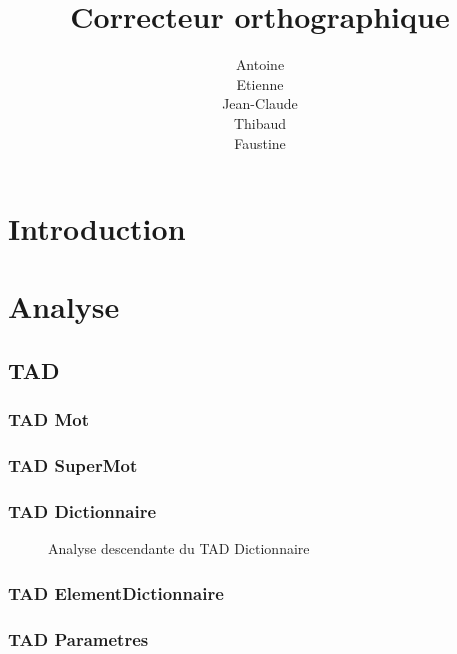 \documentclass[12pt,titlepage,a4paper]{report}
\title{Correcteur orthographique}
\author{Antoine \bsc{Augusti}\\ Etienne \bsc{Batise}\\ Jean-Claude \bsc{Bernard}\\ Thibaud \bsc{Dauce}\\Faustine \bsc{Demiselle}}
\newcommand{\inputAnalyse}[1]{}
\begin{document}

\dominitoc
\tableofcontents



\part*{Introduction}



\part{Analyse}
\chapter{TAD}
\minitoc
	\section{TAD Mot}							\inputAnalyse{TADMot}
	\section{TAD SuperMot}						\inputAnalyse{TADSuperMot}
	\section{TAD Dictionnaire}					\inputAnalyse{TADDictionnaire}

\newpage
\begin{figure}[h]
	\centering
	
	\caption{\label{analsye_descendante_TAD_dictionnaire}Analyse descendante du TAD Dictionnaire}
\end{figure}
\pagebreak

\section{TAD ElementDictionnaire}			\inputAnalyse{TADElementDictionnaire}
\section{TAD Parametres} 					\inputAnalyse{TADParametres}
\end{document}
